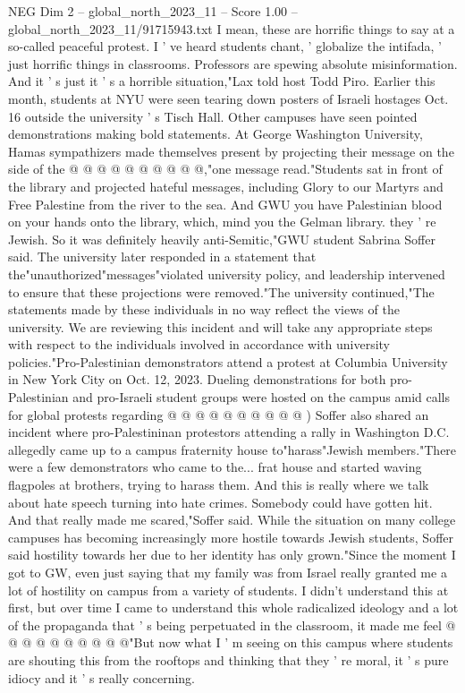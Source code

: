 \begin{textsample}{NEG Dim 2 – global\_north\_2023\_11 – Score 1.00 – global\_north\_2023\_11/91715943.txt}
I mean, these are horrific things to say at a so-called peaceful protest.
I ' ve heard students chant, ' globalize the intifada, ' just horrific things in classrooms.
Professors are spewing absolute misinformation.
And it ' s just it ' s a horrible situation,"Lax told host Todd Piro.
Earlier this month, students at NYU were seen tearing down posters of Israeli hostages Oct. 16 outside the university ' s Tisch Hall.
Other campuses have seen pointed demonstrations making bold statements.
At George Washington University, Hamas sympathizers made themselves present by projecting their message on the side of the @ @ @ @ @ @ @ @ @ @,"one message read."Students sat in front of the library and projected hateful messages, including Glory to our Martyrs and Free Palestine from the river to the sea.
And GWU you have Palestinian blood on your hands onto the library, which, mind you the Gelman library. they ' re Jewish.
So it was definitely heavily anti-Semitic,"GWU student Sabrina Soffer said.
The university later responded in a statement that the"unauthorized"messages"violated university policy, and leadership intervened to ensure that these projections were removed."The university continued,"The statements made by these individuals in no way reflect the views of the university.
We are reviewing this incident and will take any appropriate steps with respect to the individuals involved in accordance with university policies."Pro-Palestinian demonstrators attend a protest at Columbia University in New York City on Oct. 12, 2023.
Dueling demonstrations for both pro-Palestinian and pro-Israeli student groups were hosted on the campus amid calls for global protests regarding @ @ @ @ @ @ @ @ @ @ ) Soffer also shared an incident where pro-Palestininan protestors attending a rally in Washington D.C. allegedly came up to a campus fraternity house to"harass"Jewish members."There were a few demonstrators who came to the... frat house and started waving flagpoles at brothers, trying to harass them.
And this is really where we talk about hate speech turning into hate crimes.
Somebody could have gotten hit.
And that really made me scared,"Soffer said.
While the situation on many college campuses has becoming increasingly more hostile towards Jewish students, Soffer said hostility towards her due to her identity has only grown."Since the moment I got to GW, even just saying that my family was from Israel really granted me a lot of hostility on campus from a variety of students.
I didn't understand this at first, but over time I came to understand this whole radicalized ideology and a lot of the propaganda that ' s being perpetuated in the classroom, it made me feel @ @ @ @ @ @ @ @ @ @"But now what I ' m seeing on this campus where students are shouting this from the rooftops and thinking that they ' re moral, it ' s pure idiocy and it ' s really concerning.

\end{textsample}
